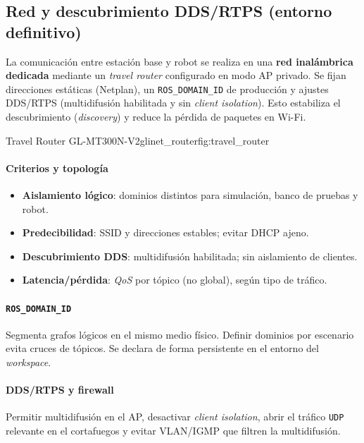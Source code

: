 \subsection{Red y descubrimiento DDS/RTPS (entorno definitivo)}
\label{sec:red_dds}

La comunicación entre estación base y robot se realiza en una \textbf{red inalámbrica dedicada} mediante un \textit{travel router} configurado en modo AP privado. Se fijan direcciones estáticas (Netplan), un \texttt{ROS\_DOMAIN\_ID} de producción y ajustes DDS/RTPS (multidifusión habilitada y sin \emph{client isolation}). Esto estabiliza el descubrimiento (\emph{discovery}) y reduce la pérdida de paquetes en Wi-Fi.

{Travel Router GL-MT300N-V2}{glinet_router}{fig:travel_router}

\paragraph{Criterios y topología}
\begin{itemize}
  \item \textbf{Aislamiento lógico}: dominios distintos para simulación, banco de pruebas y robot.
  \item \textbf{Predecibilidad}: SSID y direcciones estables; evitar DHCP ajeno.
  \item \textbf{Descubrimiento DDS}: multidifusión habilitada; sin aislamiento de clientes.
  \item \textbf{Latencia/pérdida}: \textit{QoS} por tópico (no global), según tipo de tráfico.
\end{itemize}

\paragraph{\texttt{ROS\_DOMAIN\_ID}}
Segmenta grafos lógicos en el mismo medio físico. Definir dominios por escenario evita cruces de tópicos. Se declara de forma persistente en el entorno del \textit{workspace}.

\paragraph{DDS/RTPS y firewall}
Permitir multidifusión en el AP, desactivar \emph{client isolation}, abrir el tráfico \texttt{UDP} relevante en el cortafuegos y evitar VLAN/IGMP que filtren la multidifusión.

